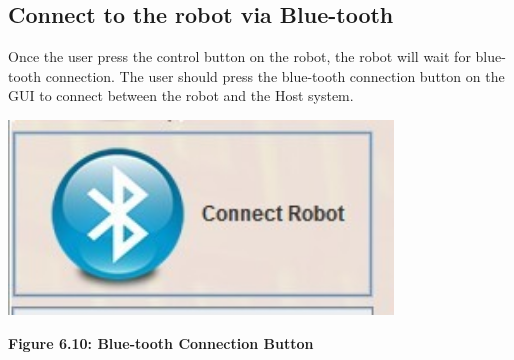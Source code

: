 \documentclass[11pt, a4paper]{report}
\begin{document}
\subsection{Connect to the robot via Blue-tooth}
Once the user press the control button on the robot, the robot will wait for blue-tooth connection. The user should press the blue-tooth connection button on the GUI to connect between the robot and the Host system.
 \begin{center}
 \includegraphics[width=10.20cm]{ConnectButton.jpg}
\end{center}
\begin{center}
\textbf {Figure 6.10: Blue-tooth Connection Button } \\[0.3cm]
\end{center}
\end{document}
